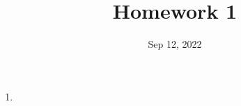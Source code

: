 \documentclass[11pt,letterpaper]{article}
\date{Sep 12, 2022}
\title{Homework 1}
\begin{document}
\maketitle
\setcounter{exercise_section}{1}

\begin{enumerate}
  \item
\end{enumerate}
\end{document}
